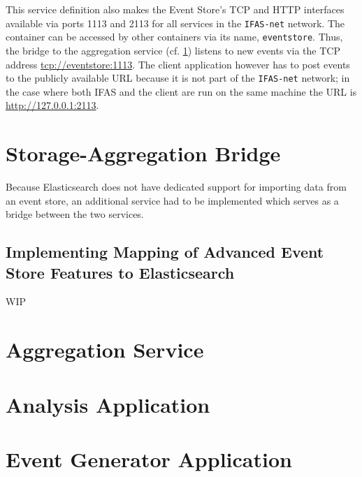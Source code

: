 This service definition also makes the Event Store's \ac{TCP} and \ac{HTTP} interfaces available via ports 1113 and 2113 for all services in the \texttt{IFAS-net} network.
The container can be accessed by other containers via its name, \texttt{eventstore}.
Thus, the bridge to the aggregation service (cf. \cref{sec:implementation:bridge}) listens to new events via the \ac{TCP} address \url{tcp://eventstore:1113}.
The client application however has to post events to the publicly available URL because it is not part of the \texttt{IFAS-net} network; in the case where both \ac{IFAS} and the client are run on the same machine the URL is \url{http://127.0.0.1:2113}.

\section{Storage-Aggregation Bridge}
\label{sec:implementation:bridge}

Because Elasticsearch does not have dedicated support for importing data from an event store, an additional service had to be implemented which serves as a bridge between the two services.

\subsection{Implementing Mapping of Advanced Event Store Features to Elasticsearch}
\label{subsec:implementation:bridge:mapping}

WIP

\section{Aggregation Service}
\label{sec:implementation:aggregation}

\section{Analysis Application}
\label{sec:implementation:analysis}

\section{Event Generator Application}
\label{sec:implementation:event-generator}

